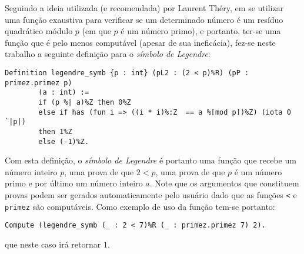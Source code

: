 Seguindo a ideia utilizada (e recomendada) por Laurent Théry, em se utilizar uma função exaustiva para verificar se um determinado número é um resíduo quadrático módulo $p$ (em que $p$ é um número primo), e portanto, ter-se uma função que é pelo menos computável (apesar de sua ineficácia), fez-se neste trabalho a seguinte definição para o \textit{símbolo de Legendre}:
\begin{lstlisting}[language=coq]
        Definition legendre_symb {p : int} (pL2 : (2 < p)%R) (pP : primez.primez p) 
        (a : int) :=
        if (p %| a)%Z then 0%Z
        else if has (fun i => ((i * i)%:Z  == a %[mod p])%Z) (iota 0 `|p|)
        then 1%Z
        else (-1)%Z.
\end{lstlisting}
Com esta definição, o \textit{símbolo de Legendre} é portanto uma função que recebe um número inteiro $p$, uma prova de que $2 < p$, uma prova de que $p$ é um número primo e por último um número inteiro $a$. Note que os argumentos que constituem provas podem ser gerados automaticamente pelo usuário dado que as funções \lstinline[language=coq]!<! e \lstinline[language=coq]!primez! são computáveis. Como exemplo de uso da função tem-se portanto:
\begin{lstlisting}[language=coq]
        Compute (legendre_symb (_ : 2 < 7)%R (_ : primez.primez 7) 2).
\end{lstlisting}
que neste caso irá retornar $1$.


